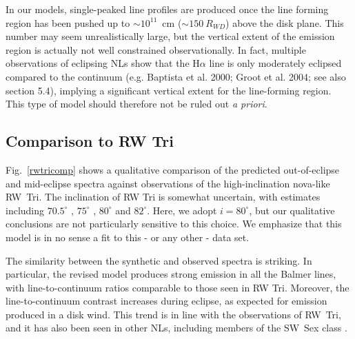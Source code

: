\documentclass[preprint, a4paper, 11pt]{aastex}
\begin{document}
In our models, single-peaked line profiles are produced once the line forming region has been
pushed up to $\sim 10^{11}$~cm ($\sim150~R_{WD}$) above the disk plane. 
This number may seem unrealistically large, but the vertical extent of 
the emission region is actually not well constrained observationally. 
In fact, multiple observations of eclipsing NLs show that the H$\alpha$ 
line is only moderately eclipsed compared to the continuum (e.g. Baptista et al. 2000;
Groot et al. 2004; see also section 5.4), 
implying a significant vertical extent for the line-forming 
region. This type of model should therefore not be ruled out {\em a priori}. 




\subsection{Comparison to RW Tri}


Fig.~\ref{rwtricomp} shows a qualitative comparison of the predicted
out-of-eclipse and mid-eclipse spectra against observations of the
high-inclination nova-like RW~Tri. The inclination of RW Tri is
somewhat uncertain, with estimates including $70.5^\circ$
\citep{smak1995}, $75^\circ$ \citep{groot2004}, $80^\circ$
\citep{longmore1981} and $82^\circ$\citep{frankking1981}. Here, we
adopt $i = 80^\circ$, but our qualitative conclusions are not
particularly sensitive to this choice. We emphasize that this
model is in no sense a fit to this - or any other - data set.


The similarity between the synthetic and observed spectra is
striking. In particular, the revised model produces strong emission in
all the Balmer lines, with line-to-continuum ratios comparable to
those seen in RW Tri. Moreover, the line-to-continuum contrast
increases during eclipse, as expected for emission produced in a disk
wind. This trend is in line with the observations of RW~Tri, and it
has also been seen in other NLs, including members of the SW~Sex class
\citep{neustroev2011}.
\end{document}
